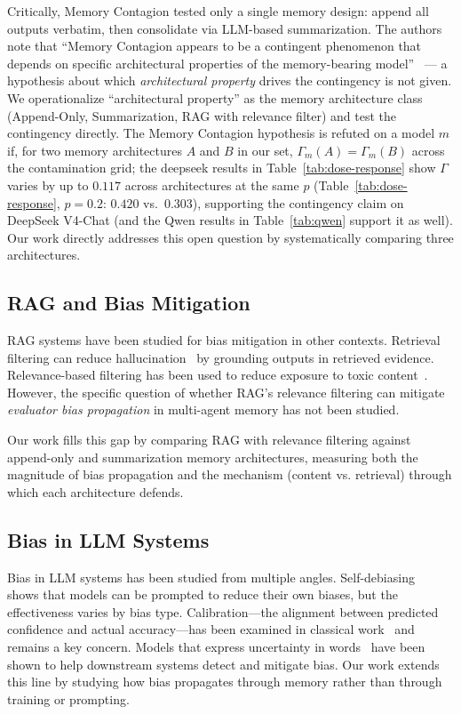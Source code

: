 \documentclass[11pt]{article}
\begin{document}
Critically, Memory Contagion tested only a single memory design: append all outputs verbatim, then consolidate via LLM-based summarization. The authors note that ``Memory Contagion appears to be a contingent phenomenon that depends on specific architectural properties of the memory-bearing model''~\cite{memorycontagion2026} --- a hypothesis about which \emph{architectural property} drives the contingency is not given. We operationalize ``architectural property'' as the memory architecture class (Append-Only, Summarization, RAG with relevance filter) and test the contingency directly. The Memory Contagion hypothesis is refuted on a model $m$ if, for two memory architectures $A$ and $B$ in our set, $\Gamma_m(A) = \Gamma_m(B)$ across the contamination grid; the deepseek results in Table~\ref{tab:dose-response} show $\Gamma$ varies by up to $0.117$ across architectures at the same $p$ (Table~\ref{tab:dose-response}, $p{=}0.2$: $0.420$ vs.\ $0.303$), supporting the contingency claim on DeepSeek V4-Chat (and the Qwen results in Table~\ref{tab:qwen} support it as well). Our work directly addresses this open question by systematically comparing three architectures.

\subsection{RAG and Bias Mitigation}

RAG systems have been studied for bias mitigation in other contexts. Retrieval filtering can reduce hallucination~\cite{gao2024retrieval} by grounding outputs in retrieved evidence. Relevance-based filtering has been used to reduce exposure to toxic content~\cite{gehman2020realtoxicityprompts}. However, the specific question of whether RAG's relevance filtering can mitigate \emph{evaluator bias propagation} in multi-agent memory has not been studied.

Our work fills this gap by comparing RAG with relevance filtering against append-only and summarization memory architectures, measuring both the magnitude of bias propagation and the mechanism (content vs. retrieval) through which each architecture defends.

\subsection{Bias in LLM Systems}

Bias in LLM systems has been studied from multiple angles. Self-debiasing~\cite{schick2021debiasing} shows that models can be prompted to reduce their own biases, but the effectiveness varies by bias type. Calibration---the alignment between predicted confidence and actual accuracy---has been examined in classical work~\cite{guo2017calibration,kadavath2022language} and remains a key concern. Models that express uncertainty in words~\cite{lin2022teach} have been shown to help downstream systems detect and mitigate bias. Our work extends this line by studying how bias propagates through memory rather than through training or prompting.
\end{document}
